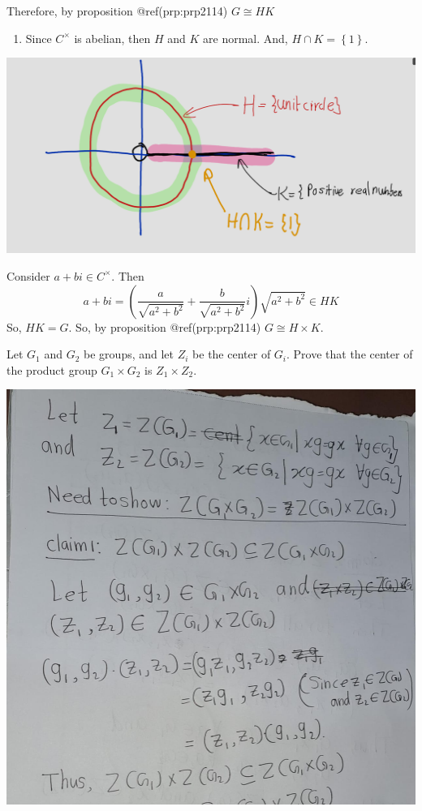 \documentclass[
]{book}
\providecommand{\tightlist}{%
  \setlength{\itemsep}{0pt}\setlength{\parskip}{0pt}}
\begin{document}
Therefore, by proposition @ref(prp:prp2114) \(G\cong HK\)

\begin{enumerate}
\def\labelenumi{(\alph{enumi})}
\setcounter{enumi}{2}
\tightlist
\item
  Since \(C^\times\) is abelian, then \(H\) and \(K\) are normal. And,
  \(H \cap K = \left\lbrace 1 \right\rbrace\).
\end{enumerate}

\includegraphics{figures/ch_2/fig03.png}

Consider \(a + bi \in C^\times\). Then
\[a + bi = \left(\frac{a}{\sqrt{a^2+b^2}} + \frac{b}{\sqrt{a^2+b^2}}i\right)\sqrt{a^2+b^2} \in HK\]
So, \(HK = G\). So, by proposition @ref(prp:prp2114)
\(G \cong H \times K\).

\leavevmode{}%
Let \(G_1\) and \(G_2\) be groups, and let \(Z_i\) be the center of
\(G_i\). Prove that the center of the product group \(G_1 \times G_2\)
is \(Z_1 \times Z_2\).

\includegraphics{figures/ch_2/fig04.jpg}
\end{document}
